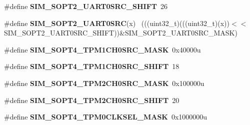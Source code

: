 \begin{DoxyCompactItemize}
\item 
\hypertarget{group___s_i_m___register___masks_ga0790a9307dcaad17166308eb2f1b62df}{}\#define {\bfseries S\+I\+M\+\_\+\+S\+O\+P\+T2\+\_\+\+U\+A\+R\+T0\+S\+R\+C\+\_\+\+S\+H\+I\+F\+T}~26\label{group___s_i_m___register___masks_ga0790a9307dcaad17166308eb2f1b62df}

\item 
\hypertarget{group___s_i_m___register___masks_gad369490bacab902bab4d71b8396c896d}{}\#define {\bfseries S\+I\+M\+\_\+\+S\+O\+P\+T2\+\_\+\+U\+A\+R\+T0\+S\+R\+C}(x)                                    ~(((uint32\+\_\+t)(((uint32\+\_\+t)(x))$<$$<$S\+I\+M\+\_\+\+S\+O\+P\+T2\+\_\+\+U\+A\+R\+T0\+S\+R\+C\+\_\+\+S\+H\+I\+F\+T))\&S\+I\+M\+\_\+\+S\+O\+P\+T2\+\_\+\+U\+A\+R\+T0\+S\+R\+C\+\_\+\+M\+A\+S\+K)\label{group___s_i_m___register___masks_gad369490bacab902bab4d71b8396c896d}

\item 
\hypertarget{group___s_i_m___register___masks_ga9897da591b25b25a121a2321c5515923}{}\#define {\bfseries S\+I\+M\+\_\+\+S\+O\+P\+T4\+\_\+\+T\+P\+M1\+C\+H0\+S\+R\+C\+\_\+\+M\+A\+S\+K}~0x40000u\label{group___s_i_m___register___masks_ga9897da591b25b25a121a2321c5515923}

\item 
\hypertarget{group___s_i_m___register___masks_ga79b1e63028e073fbe12351561f1b7645}{}\#define {\bfseries S\+I\+M\+\_\+\+S\+O\+P\+T4\+\_\+\+T\+P\+M1\+C\+H0\+S\+R\+C\+\_\+\+S\+H\+I\+F\+T}~18\label{group___s_i_m___register___masks_ga79b1e63028e073fbe12351561f1b7645}

\item 
\hypertarget{group___s_i_m___register___masks_ga871c6061ab30b4ad99b919e35e86c081}{}\#define {\bfseries S\+I\+M\+\_\+\+S\+O\+P\+T4\+\_\+\+T\+P\+M2\+C\+H0\+S\+R\+C\+\_\+\+M\+A\+S\+K}~0x100000u\label{group___s_i_m___register___masks_ga871c6061ab30b4ad99b919e35e86c081}

\item 
\hypertarget{group___s_i_m___register___masks_ga85ccc239517b7633b2c0a164b8d5cbf3}{}\#define {\bfseries S\+I\+M\+\_\+\+S\+O\+P\+T4\+\_\+\+T\+P\+M2\+C\+H0\+S\+R\+C\+\_\+\+S\+H\+I\+F\+T}~20\label{group___s_i_m___register___masks_ga85ccc239517b7633b2c0a164b8d5cbf3}

\item 
\hypertarget{group___s_i_m___register___masks_gae889ccb89e5c139f002b6a62d21628a9}{}\#define {\bfseries S\+I\+M\+\_\+\+S\+O\+P\+T4\+\_\+\+T\+P\+M0\+C\+L\+K\+S\+E\+L\+\_\+\+M\+A\+S\+K}~0x1000000u\label{group___s_i_m___register___masks_gae889ccb89e5c139f002b6a62d21628a9}


\end{DoxyCompactItemize}
